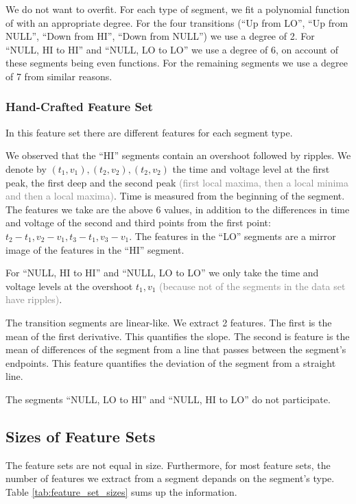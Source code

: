 \documentclass[conference]{IEEEtran}
\begin{document}
  We do not want to overfit. For each type of segment, we fit a polynomial function of with an appropriate degree. For the four transitions (``Up from LO'', ``Up from NULL'', ``Down from HI'', ``Down from NULL'') we use a degree of 2. For ``NULL, HI to HI'' and ``NULL, LO to LO'' we use a degree of 6, on account of these segments being even functions. For the remaining segments we use a degree of 7 from similar reasons.
  
\subsubsection{Hand-Crafted Feature Set}

  In this feature set there are different features for each segment type.
  
  We observed that the ``HI'' segments contain an overshoot followed by ripples. We denote by \((t_1, v_1), (t_2, v_2), (t_2, v_2)\) the time and voltage level at the first peak, the first deep and the second peak \textcolor{gray}{(first local maxima, then a local minima and then a local maxima)}. Time is measured from the beginning of the segment. The features we take are the above 6 values, in addition to the differences in time and voltage of the second and third points from the first point: \(t_2-t_1, v_2-v_1, t_3-t_1, v_3-v_1\). The features in the ``LO'' segments are a mirror image of the features in the ``HI'' segment.
  
  For ``NULL, HI to HI'' and ``NULL, LO to LO'' we only take the time and voltage levels at the overshoot \(t_1, v_1\) \textcolor{gray}{(because not of the segments in the data set have ripples)}.
  
  The transition segments are linear-like. We extract 2 features. The first is the mean of the first derivative. This quantifies the slope. The second is feature is the mean of differences of the segment from a line that passes between the segment's endpoints. This feature quantifies the deviation of the segment from a straight line.
  
  The segments ``NULL, LO to HI'' and ``NULL, HI to LO'' do not participate.
  
\subsection{Sizes of Feature Sets}

  The feature sets are not equal in size. Furthermore, for most feature sets, the number of features we extract from a segment depands on the segment's type. Table \ref{tab:feature_set_sizes} sums up the information.
\end{document}
